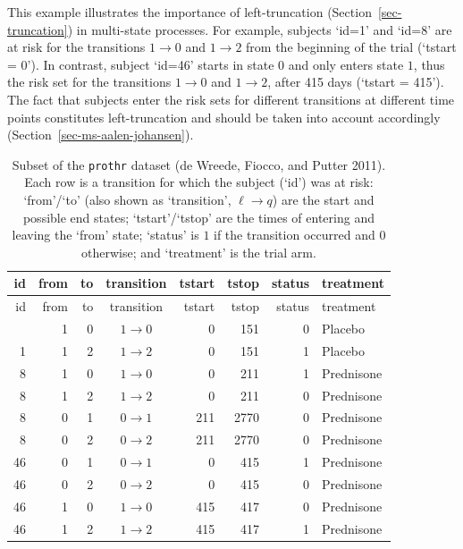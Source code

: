 \documentclass[
  letterpaper,
  krantz2]{style/krantz}
\begin{document}
This example illustrates the importance of left-truncation
(Section~\ref{sec-truncation}) in multi-state processes. For example,
subjects `id=1' and `id=8' are at risk for the transitions
\(1 \rightarrow 0\) and \(1 \rightarrow 2\) from the beginning of the
trial (`tstart = 0'). In contrast, subject `id=46' starts in state 0 and
only enters state \(1\), thus the risk set for the transitions
\(1\rightarrow 0\) and \(1\rightarrow 2\), after 415 days (`tstart =
415'). The fact that subjects enter the risk sets for different
transitions at different time points constitutes left-truncation and
should be taken into account accordingly
(Section~\ref{sec-ms-aalen-johansen}).

\begin{longtable}[]{@{}rrrcrrrl@{}}
\caption{Subset of the \texttt{prothr} dataset (de Wreede, Fiocco, and
Putter 2011). Each row is a transition for which the subject (`id') was
at risk: `from'/`to' (also shown as `transition',
\(\ell \rightarrow q\)) are the start and possible end states;
`tstart'/`tstop' are the times of entering and leaving the `from' state;
`status' is \(1\) if the transition occurred and \(0\) otherwise; and
`treatment' is the trial arm.}\label{tbl-ms-data-prothr}\tabularnewline
\toprule\noalign{}
id & from & to & transition & tstart & tstop & status & treatment \\
\midrule\noalign{}
\endfirsthead
\toprule\noalign{}
id & from & to & transition & tstart & tstop & status & treatment \\
\midrule\noalign{}
\endhead
\bottomrule\noalign{}
\endlastfoot
1 & 1 & 0 & \(1 \rightarrow 0\) & 0 & 151 & 0 & Placebo \\
1 & 1 & 2 & \(1 \rightarrow 2\) & 0 & 151 & 1 & Placebo \\
8 & 1 & 0 & \(1 \rightarrow 0\) & 0 & 211 & 1 & Prednisone \\
8 & 1 & 2 & \(1 \rightarrow 2\) & 0 & 211 & 0 & Prednisone \\
8 & 0 & 1 & \(0 \rightarrow 1\) & 211 & 2770 & 0 & Prednisone \\
8 & 0 & 2 & \(0 \rightarrow 2\) & 211 & 2770 & 0 & Prednisone \\
46 & 0 & 1 & \(0 \rightarrow 1\) & 0 & 415 & 1 & Prednisone \\
46 & 0 & 2 & \(0 \rightarrow 2\) & 0 & 415 & 0 & Prednisone \\
46 & 1 & 0 & \(1 \rightarrow 0\) & 415 & 417 & 0 & Prednisone \\
46 & 1 & 2 & \(1 \rightarrow 2\) & 415 & 417 & 1 & Prednisone \\
\end{longtable}
\end{document}
